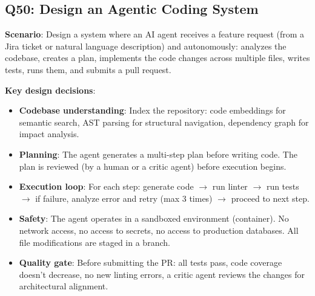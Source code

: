 \subsection{Q50: Design an Agentic Coding System}

\textbf{Scenario}: Design a system where an AI agent receives a feature request (from a Jira ticket or natural language description) and autonomously: analyzes the codebase, creates a plan, implements the code changes across multiple files, writes tests, runs them, and submits a pull request.

\textbf{Key design decisions}:
\begin{itemize}[leftmargin=*]
    \item \textbf{Codebase understanding}: Index the repository: code embeddings for semantic search, AST parsing for structural navigation, dependency graph for impact analysis.
    \item \textbf{Planning}: The agent generates a multi-step plan before writing code. The plan is reviewed (by a human or a critic agent) before execution begins.
    \item \textbf{Execution loop}: For each step: generate code $\to$ run linter $\to$ run tests $\to$ if failure, analyze error and retry (max 3 times) $\to$ proceed to next step.
    \item \textbf{Safety}: The agent operates in a sandboxed environment (container). No network access, no access to secrets, no access to production databases. All file modifications are staged in a branch.
    \item \textbf{Quality gate}: Before submitting the PR: all tests pass, code coverage doesn't decrease, no new linting errors, a critic agent reviews the changes for architectural alignment.
\end{itemize}

